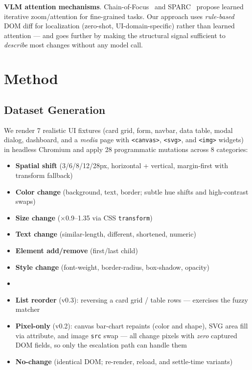 \documentclass[10pt,twocolumn,letterpaper]{article}
\begin{document}
\textbf{VLM attention mechanisms}. Chain-of-Focus~\cite{chainoffocus2026} and SPARC~\cite{sparc2026} propose learned iterative zoom/attention for fine-grained tasks. Our approach uses \textit{rule-based} DOM diff for localization (zero-shot, UI-domain-specific) rather than learned attention — and goes further by making the structural signal sufficient to \textit{describe} most changes without any model call.

\section{Method}

\subsection{Dataset Generation}

We render 7 realistic UI fixtures (card grid, form, navbar, data table, modal dialog, dashboard, and a \textit{media} page with \texttt{<canvas>}, \texttt{<svg>}, and \texttt{<img>} widgets) in headless Chromium and apply 28 programmatic mutations across 8 categories:

\begin{itemize}
\item \textbf{Spatial shift} (3/6/8/12/28px, horizontal + vertical, margin-first with transform fallback)
\item \textbf{Color change} (background, text, border; subtle hue shifts and high-contrast swaps)
\item \textbf{Size change} ($\times$0.9--1.35 via CSS \texttt{transform})
\item \textbf{Text change} (similar-length, different, shortened, numeric)
\item \textbf{Element add/remove} (first/last child)
\item \textbf{Style change} (font-weight, border-radius, box-shadow, opacity)
\item \item \textbf{List reorder} (v0.3): reversing a card grid / table rows — exercises the fuzzy matcher
\item \textbf{Pixel-only} (v0.2): canvas bar-chart repaints (color and shape), SVG area fill via attribute, and image \texttt{src} swap — all change pixels with \textit{zero} captured DOM fields, so only the escalation path can handle them
\item \textbf{No-change} (identical DOM; re-render, reload, and settle-time variants)
\end{itemize}
\end{document}
